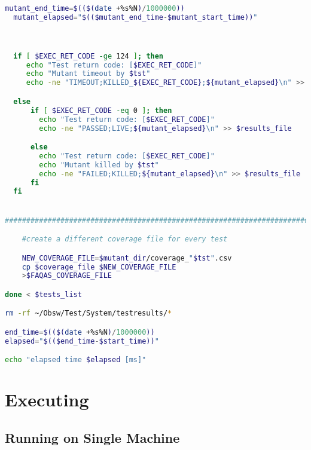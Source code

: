 \begin{lstlisting}[label={lst:run_tests},language=bash]
  mutant_end_time=$(($(date +%s%N)/1000000))
  mutant_elapsed="$(($mutant_end_time-$mutant_start_time))"



  if [ $EXEC_RET_CODE -ge 124 ]; then
     echo "Test return code: [$EXEC_RET_CODE]"
     echo "Mutant timeout by $tst"
     echo -ne "TIMEOUT;KILLED_${EXEC_RET_CODE};${mutant_elapsed}\n" >> $results_file

  else
      if [ $EXEC_RET_CODE -eq 0 ]; then
        echo "Test return code: [$EXEC_RET_CODE]"
        echo -ne "PASSED;LIVE;${mutant_elapsed}\n" >> $results_file

      else
        echo "Test return code: [$EXEC_RET_CODE]"
        echo "Mutant killed by $tst"
        echo -ne "FAILED;KILLED;${mutant_elapsed}\n" >> $results_file
      fi
  fi


###############################################################################

	#create a different coverage file for every test

	NEW_COVERAGE_FILE=$mutant_dir/coverage_"$tst".csv
	cp $coverage_file $NEW_COVERAGE_FILE
	>$FAQAS_COVERAGE_FILE

done < $tests_list

rm -rf ~/Obsw/Test/System/testresults/*

end_time=$(($(date +%s%N)/1000000))
elapsed="$(($end_time-$start_time))"

echo "elapsed time $elapsed [ms]"


\end{lstlisting}

\section{Executing \DAMA}

\subsection{Running \DAMA on Single Machine}
\label{sec:dama_singlelaunch}

%

